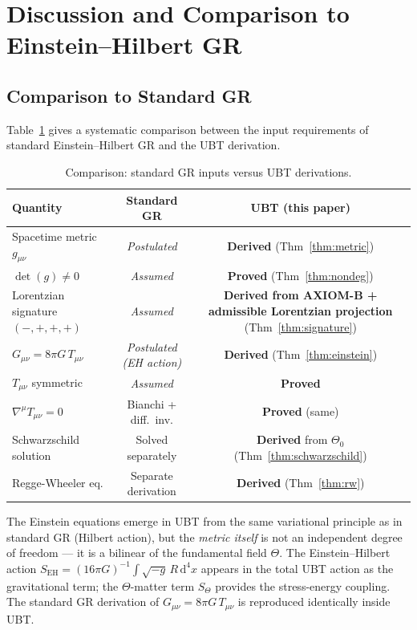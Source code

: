\documentclass[12pt,a4paper]{article}
\theoremstyle{definition}
\theoremstyle{remark}
\begin{document}
\section{Discussion and Comparison to Einstein--Hilbert GR}
\label{sec:discussion}

\subsection{Comparison to Standard GR}

Table~\ref{tab:comparison} gives a systematic comparison between the input
requirements of standard Einstein--Hilbert GR and the UBT derivation.

\begin{table}[ht]
\centering
\caption{Comparison: standard GR inputs versus UBT derivations.}
\label{tab:comparison}
\begin{tabular}{lcc}
\toprule
\textbf{Quantity} & \textbf{Standard GR} & \textbf{UBT (this paper)} \\
\midrule
Spacetime metric $g_{\mu\nu}$ & \emph{Postulated} & \textbf{Derived} (Thm~\ref{thm:metric}) \\
$\det(g) \neq 0$ & \emph{Assumed} & \textbf{Proved} (Thm~\ref{thm:nondeg}) \\
Lorentzian signature $(-,+,+,+)$ & \emph{Assumed} & \textbf{Derived from AXIOM-B + admissible Lorentzian projection} (Thm~\ref{thm:signature}) \\
$G_{\mu\nu} = 8\pi G\,T_{\mu\nu}$ & \emph{Postulated (EH action)} & \textbf{Derived} (Thm~\ref{thm:einstein}) \\
$T_{\mu\nu}$ symmetric & \emph{Assumed} & \textbf{Proved} \\
$\nabla^\mu T_{\mu\nu} = 0$ & Bianchi + diff.\ inv. & \textbf{Proved} (same) \\
Schwarzschild solution & Solved separately & \textbf{Derived} from $\Theta_0$ (Thm~\ref{thm:schwarzschild}) \\
Regge-Wheeler eq. & Separate derivation & \textbf{Derived} (Thm~\ref{thm:rw}) \\
\bottomrule
\end{tabular}
\end{table}

The Einstein equations emerge in UBT from the same variational principle as
in standard GR (Hilbert action), but the \emph{metric itself} is not an
independent degree of freedom --- it is a bilinear of the fundamental field
$\Theta$.
The Einstein--Hilbert action $S_{\mathrm{EH}} = (16\pi G)^{-1}\int\!\sqrt{-g}\,R\,\mathrm{d}^4x$
appears in the total UBT action as the gravitational term; the $\Theta$-matter
term $S_\Theta$ provides the stress-energy coupling.
The standard GR derivation of $G_{\mu\nu} = 8\pi G\,T_{\mu\nu}$ is
reproduced identically inside UBT.
\end{document}
